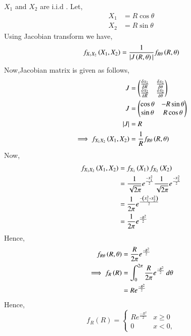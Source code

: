 \documentclass[journal,12pt,twocolumn]{IEEEtran}
\renewcommand\thesection{\arabic{section}}
\begin{document}
\begin{enumerate}[label=\thesection.\arabic*
,ref=\thesection.\theenumi]
\solution
$X_1$ and $X_2$ are i.i.d . Let,
\begin{align}
    X_1 &= R\cos{\theta} \\
    X_2 &= R\sin{\theta}
\end{align}
Using Jacobian transform we have,
\begin{align}
   f_{X_1X_2}\left(X_1,X_2\right) = \frac{1}{|J\left(R,\theta\right)|} f_{R\theta}\left(R,\theta\right)
\end{align}
Now,Jacobian matrix is given as follows,
\begin{align}
    J                        & = \begin{pmatrix}\frac{\delta x_1}{\delta R}                      & \frac{\delta x_1}{\delta \theta} \\ \frac{\delta x_2}{\delta R} & \frac{\delta x_2}{\delta \theta}\end{pmatrix}\\
    J                        & = \begin{pmatrix}\cos\theta                                       & -R\sin\theta                     \\ \sin\theta & R\cos\theta\end{pmatrix}\\
    |J|                      & = R \\
    \implies f_{X_1X_2}\left(X_1,X_2\right) &= \frac{1}{R}f_{R\theta}\left(R,\theta\right)
\end{align}
Now,
\begin{align}
    f_{X_1X_2}\left(X_1,X_2\right) &= f_{X_1}\left(X_1\right)f_{X_2}\left(X_2\right) \\
                             &= \frac{1}{\sqrt{2\pi}}e^{\frac{-X_1^2}{2}} \frac{1}{\sqrt{2\pi}}e^{\frac{-X_2^2}{2}} \\
                             &= \frac{1}{2\pi}e^{\frac{-\left(X_1^2 + X_2^2\right)}{2}} \\
                             &= \frac{1}{2\pi}e^{\frac{-R^2}{2}}
\end{align}
Hence,
\begin{align}
    f_{R\theta}\left(R,\theta\right) &= \frac{R}{2\pi}e^{\frac{-R^2}{2}} \\
    \implies f_{R}\left(R\right) &= \int_{0}^{2\pi} \frac{R}{2\pi}e^{\frac{-R^2}{2}}\,d\theta \\
                           &= R e^{\frac{-R^2}{2}}
\end{align}
Hence,
\begin{equation}
f_{R}(R) = 
\begin{cases}
R e^{\frac{-R^2}{2}} & x \geq 0 \\
0 & x < 0,
\end{cases}
\end{equation}
\begin{equation}

\end{equation}
\end{enumerate}
\end{document}
